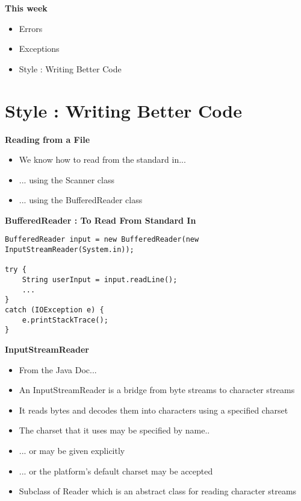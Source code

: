 \documentclass{beamer}
\begin{document}
\begin{frame}
\begin{center}
\textbf{This week }
\end{center}
\begin{itemize}
\item Errors
\item Exceptions
\item Style : Writing Better Code
\end{itemize}
\end{frame}

\section{Style : Writing Better Code}

\begin{frame}
\begin{center}
\textbf{Reading from a File}
\end{center}
\begin{itemize}
\item We know how to read from the standard in...
\item ... using the Scanner class
\item ... using the BufferedReader class
\end{itemize}
\end{frame}

\begin{frame}[fragile]
\begin{center}
\textbf{BufferedReader : To Read From Standard In}
\end{center}
\begin{block}{}
\begin{lstlisting}
BufferedReader input = new BufferedReader(new InputStreamReader(System.in));

try {
    String userInput = input.readLine();
    ...
}
catch (IOException e) {
    e.printStackTrace();
}
\end{lstlisting}
\end{block}
\end{frame}

\begin{frame}[fragile]
\begin{center}
\textbf{InputStreamReader}
\end{center}
\begin{itemize}
\item From the Java Doc...
\bigskip
\item An InputStreamReader is a bridge from byte streams to character streams 
\item It reads bytes and decodes them into characters using a specified charset
\item The charset that it uses may be specified by name.. 
\item ... or may be given explicitly 
\item ... or the platform's default charset may be accepted
\bigskip
\item Subclass of Reader which is an abstract class for reading character streams
\end{itemize}
\end{frame}
\end{document}
